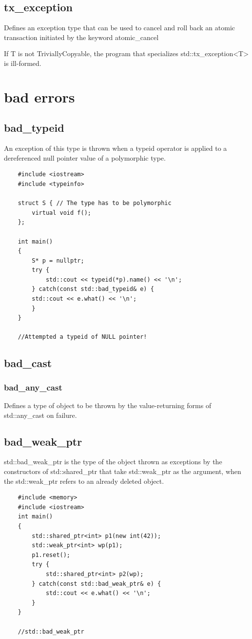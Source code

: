 \documentclass[UTF8,a4paper,12pt]{ctexbook}
\begin{document}
		\subsection{tx\_exception}
				Defines an exception type that can be used to cancel and roll back an atomic transaction initiated by the keyword atomic\_cancel
					
				If T is not TriviallyCopyable, the program that specializes std::tx\_exception<T> is ill-formed. 
	\section{bad errors}
		\subsection{bad\_typeid}
			An exception of this type is thrown when a typeid operator is applied to a dereferenced null pointer value of a polymorphic type.
			
\begin{lstlisting}
	#include <iostream>
	#include <typeinfo>
	
	struct S { // The type has to be polymorphic
		virtual void f();
	}; 
	
	int main()
	{
		S* p = nullptr;
		try {
			std::cout << typeid(*p).name() << '\n';
		} catch(const std::bad_typeid& e) {
		std::cout << e.what() << '\n';
		}
	}
	
	//Attempted a typeid of NULL pointer!
\end{lstlisting}
		\subsection{bad\_cast}
			\subsubsection{bad\_any\_cast}
				Defines a type of object to be thrown by the value-returning forms of std::any\_cast on failure. 
		\subsection{bad\_weak\_ptr}
			std::bad\_weak\_ptr is the type of the object thrown as exceptions by the constructors of std::shared\_ptr that take std::weak\_ptr as the argument, when the std::weak\_ptr refers to an already deleted object. 
\begin{lstlisting}
	#include <memory>
	#include <iostream>
	int main()
	{
		std::shared_ptr<int> p1(new int(42));
		std::weak_ptr<int> wp(p1);
		p1.reset();
		try {
			std::shared_ptr<int> p2(wp);
		} catch(const std::bad_weak_ptr& e) {
			std::cout << e.what() << '\n';
		}
	}
	
	//std::bad_weak_ptr
\end{lstlisting}
\end{document}
